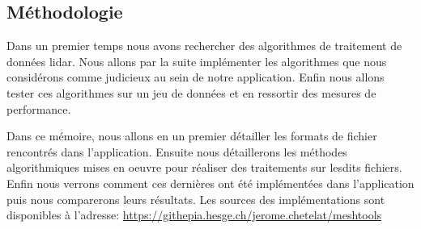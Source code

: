 \subsection*{Méthodologie}
Dans un premier temps nous avons rechercher des algorithmes de
traitement de données lidar.
Nous allons par la suite implémenter les algorithmes que nous considérons comme judicieux au sein de notre application.
Enfin nous allons tester ces algorithmes sur un jeu de données et en ressortir des mesures
de performance.

Dans ce mémoire, nous allons en un premier détailler les formats de fichier 
rencontrés dans l'application.
Ensuite nous détaillerons les méthodes algorithmiques mises en oeuvre pour
réaliser des traitements sur lesdits fichiers.
Enfin nous verrons comment ces dernières ont été implémentées dans
l'application puis nous comparerons leurs résultats.
Les sources des implémentations sont disponibles à l'adresse: \href{https://githepia.esge.ch/jerome.chetelat/meshtools}{https://githepia.hesge.ch/jerome.chetelat/meshtools}
